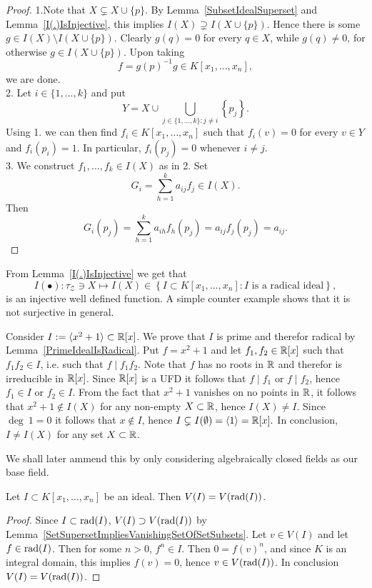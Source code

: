 \begin{proof}
    1.Note that $X\subsetneq X\cup \{p\}$. By Lemma~\ref{SubsetIdealSuperset} and  Lemma~\ref{I(.)IsInjective}, this implies $I(X) \supsetneq I(X\cup\{p\})$. Hence there is some $g\in I(X)\setminus  I(X\cup\{p\})$. Clearly $g(q)=0$ for every $q\in X$, while $g(q)\neq 0$, for otherwise $g \in I(X\cup\{p\})$. Upon taking 
    $$f = g(p)^{-1}g\in K[x_1,\dots,x_n],$$ 
    we are done.\\
    2. Let $i\in \{1,\dots,k\}$ and put 
    $$Y=X\cup \bigcup_{j\in\{1,\dots,k\} : j\neq i} \left\{p_j\right\}.$$
    Using 1. we can then find $f_i\in K[x_1,\dots,x_n]$ such that $f_i(v)=0$ for every $v\in Y$ and $f_i(p_i) = 1$. In particular, $f_i(p_j)=0$ whenever $i\neq j$.\\
    3. We construct $f_1,\dots,f_k\in I(X)$ as in 2. Set 
    $$G_i = \sum_{h=1}^k a_{ij}f_j\in I(X).$$
    Then 
    $$G_i(p_j)=\sum_{h=1}^k a_{ih}f_h(p_j) = a_{ij}f_j(p_j) = a_{ij}.$$
    
\end{proof}
From Lemma~\ref{I(.)IsInjective} we get that
$$I(\bullet):\tau_{\mathcal{Z}}\ni X\mapsto I(X)\in \left\{ I\subset K[x_1,\dots,x_n] : I \text{ is a radical ideal}\right\},$$
is an injective well defined function. A simple counter example shows that it is not surjective in general.
\begin{example}\label{I(.)IsNotSurjective}
    Consider $I:=\langle x^2+1\rangle \subset \mathbb{R}[x]$. We prove that $I$ is prime and therefor radical by Lemma~\ref{PrimeIdealIsRadical}. Put $f = x^2+1$ and let $f_1,f_2\in \mathbb{R}[x]$ such that $f_1f_2\in I$, i.e. such that $f \mid f_1f_2$. Note that $f$ has no roots in $\mathbb{R}$ and therefor is irreducible in $\mathbb{R}[x]$. Since $\mathbb{R}[x]$ is a UFD it follows that $f \mid f_1$ or $f\mid f_2$, hence $f_1\in I$ or $f_2\in I$. From the fact that $x^2+1$ vanishes on no points in $\mathbb{R}$, it follows that $x^2+1\notin I(X)$ for any non-empty $X\subset \mathbb{R}$, hence $I(X) \neq I$. Since $\deg\ 1 =0$ it follows that $x\notin I$, hence $I \subsetneq I(\emptyset) = \langle 1 \rangle = \mathbb{R}[x].$ In conclusion, $I \neq I(X)$ for any set $X\subset \mathbb{R}$. 
\end{example}
We shall later ammend this by only considering algebraically closed fields as our base field. 
\begin{lemma}\label{VanishingSetOfIdealIsVanishingSetOfRadical}
    Let $I\subset K[x_1,\dots,x_n]$ be an ideal. Then $V(I)=V(\mathrm{rad}(I))$.
\end{lemma}
\begin{proof}
    Since $I\subset \mathrm{rad}(I)$, $V(I)\supset V(\mathrm{rad}(I))$ by Lemma~\ref{SetSupersetImpliesVanishingSetOfSetSubsets}. Let $v \in V(I)$ and let $f\in \mathrm{rad}(I)$. Then for some $n>0$, $f^n\in I$. Then $0=f(v)^n$, and since $K$ is an integral domain, this implies $f(v)=0$, hence $v\in V(\mathrm{rad}(I))$. In conclusion $V(I) = V(\mathrm{rad}(I))$.
\end{proof}
